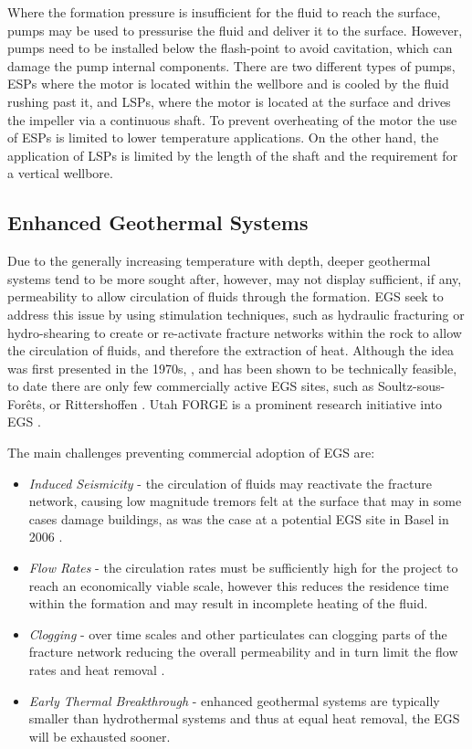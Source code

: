     Where the formation pressure is insufficient for the fluid to reach the surface, pumps may be used to pressurise the fluid and deliver it to the surface. However, pumps need to be installed below the flash-point to avoid cavitation, which can damage the pump internal components. There are two different types of pumps, \acp{ESP} where the motor is located within the wellbore and is cooled by the fluid rushing past it, and \acp{LSP}, where the motor is located at the surface and drives the impeller via a continuous shaft. To prevent overheating of the motor the use of \acp{ESP} is limited to lower temperature applications. On the other hand, the application of \acp{LSP} is limited by the length of the shaft and the requirement for a vertical wellbore.       

    \subsection{Enhanced Geothermal Systems}
    \label{sec:enhanced_geothermal_systems}

    Due to the generally increasing temperature with depth, deeper geothermal systems tend to be more sought after, however, may not display sufficient, if any, permeability to allow circulation of fluids through the formation. \ac{EGS} seek to address this issue by using stimulation techniques, such as hydraulic fracturing or hydro-shearing to create or re-activate fracture networks within the rock to allow the circulation of fluids, and therefore the extraction of heat. Although the idea was first presented in the 1970s, \cite{Potter1974}, and has been shown to be technically feasible, to date there are only few commercially active \ac{EGS} sites, such as Soultz-sous-Forêts\cite{ES2024}, or Rittershoffen \cite{ES2024}. Utah FORGE is a prominent research initiative into EGS \cite{UtahForge2024}.

    The main challenges preventing commercial adoption of EGS are:
    \begin{itemize}
        \item \emph{Induced Seismicity} - the circulation of fluids may reactivate the fracture network, causing low magnitude tremors felt at the surface that may in some cases damage buildings, as was the case at a potential \ac{EGS} site in Basel in 2006 \cite{Deichmann2009}.
        \item \emph{Flow Rates} - the circulation rates must be sufficiently high for the project to reach an economically viable scale, however this reduces the residence time within the formation and may result in incomplete heating of the fluid. 
        \item \emph{Clogging} - over time scales and other particulates can clogging parts of the fracture network reducing the overall permeability and in turn limit the flow rates and heat removal \cite{LuoKottsova2023}.
        \item \emph{Early Thermal Breakthrough} - enhanced geothermal systems are typically smaller than hydrothermal systems and thus at equal heat removal, the EGS will be exhausted sooner.
    \end{itemize}
    
